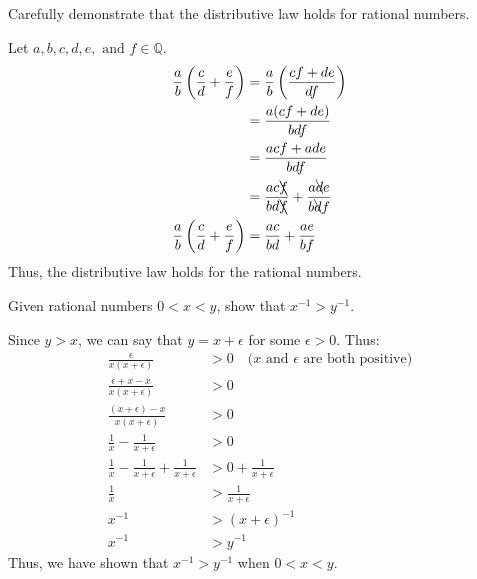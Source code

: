 \documentclass{article}
\begin{document}

\begin{problem}{}{}
    Carefully demonstrate that the distributive law holds for rational numbers.
\end{problem}
\begin{solution}{}{}
    Let $a,b,c,d,e,\text{ and }f\in\mathbb{Q}$.
    \begin{align*}
        \frac{a}{b}\left(\frac{c}{d}+\frac{e}{f}\right) &= \frac{a}{b}\left(\frac{cf+de}{df}\right) \\
        &= \frac{a(cf+de)}{bdf} \\
        &= \frac{acf+ade}{bdf} \\
        &= \frac{ac\bcancel{f}}{bd\bcancel{f}}+\frac{a\bcancel{d}e}{b\bcancel{d}f} \\
        \frac{a}{b}\left(\frac{c}{d}+\frac{e}{f}\right) &= \frac{ac}{bd}+\frac{ae}{bf}
    \end{align*}
    Thus, the distributive law holds for the rational numbers.
\end{solution}

\begin{problem}{}{}
    Given rational numbers $0<x<y$, show that $x^{-1}>y^{-1}$.
\end{problem}
\begin{solution}{}{}
    Since $y>x$, we can say that $y=x+\epsilon$ for some $\epsilon>0$. Thus:
    \begin{align*}
        \frac{\epsilon}{x(x+\epsilon)} &> 0 \quad\text{($x$ and $\epsilon$ are both positive)}\\
        \frac{\epsilon+x-x}{x(x+\epsilon)} &> 0 \\
        \frac{(x+\epsilon)-x}{x(x+\epsilon)} &> 0 \\
        \frac{1}{x}-\frac{1}{x+\epsilon} &> 0 \\
        \frac{1}{x}-\frac{1}{x+\epsilon}+\frac{1}{x+\epsilon} &> 0+\frac{1}{x+\epsilon} \\
        \frac{1}{x} &> \frac{1}{x+\epsilon} \\
        x^{-1} &> (x+\epsilon)^{-1} \\
        x^{-1} &> y^{-1}
    \end{align*}
    Thus, we have shown that $x^{-1}>y^{-1}$ when $0<x<y$.
\end{solution}
\end{document}
